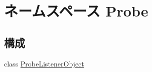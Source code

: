 \hypertarget{namespaceProbe}{
\section{ネームスペース Probe}
\label{namespaceProbe}
}
\subsection*{構成}
\begin{DoxyCompactItemize}
\item 
class \hyperlink{classProbe_1_1ProbeListenerObject}{ProbeListenerObject}
\end{DoxyCompactItemize}
